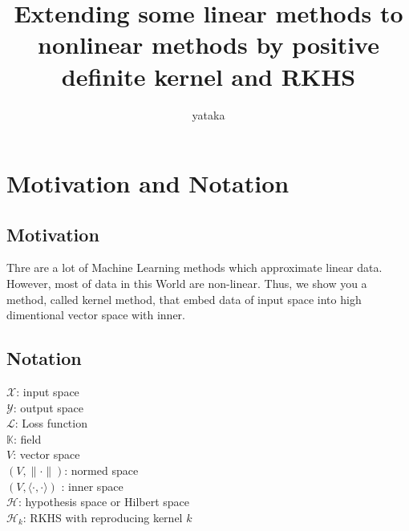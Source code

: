 \documentclass[11pt, a4paper, english, dvipdfmx]{jsarticle}
\title{Extending some linear methods to nonlinear methods by positive definite kernel and RKHS}
\author{yataka}
\date{}
\theoremstyle{definition}
\def\inner<#1>{\langle #1 \rangle}
\newcommand{\K}{\mathbb{K}}
\newcommand{\X}{\mathcal{X}}
\newcommand{\Y}{\mathcal{Y}}
\newcommand{\Hil}{\mathcal{H}}
\renewcommand{\L}{\mathcal{L}}
\begin{document}
\maketitle
\setcounter{section}{-1}
\section{Motivation and Notation}
\subsection{Motivation}
Thre are a lot of Machine Learning methods which approximate linear data.
However, most of data in this World are non-linear. Thus, we show you a method, called kernel method, that
embed data of input space into high dimentional vector space with inner.
\subsection{Notation}
\noindent
$\X$: input space\\
$\Y$: output space\\
$\L$: Loss function\\
$\K$: field\\
$V$: vector space\\
$(V, \|\cdot\|)$: normed space\\
$(V, \inner<\cdot, \cdot>)$ : inner space\\
$\Hil$: hypothesis space or Hilbert space\\
$\Hil_{k}$: RKHS with reproducing kernel $k$\\
\end{document}
